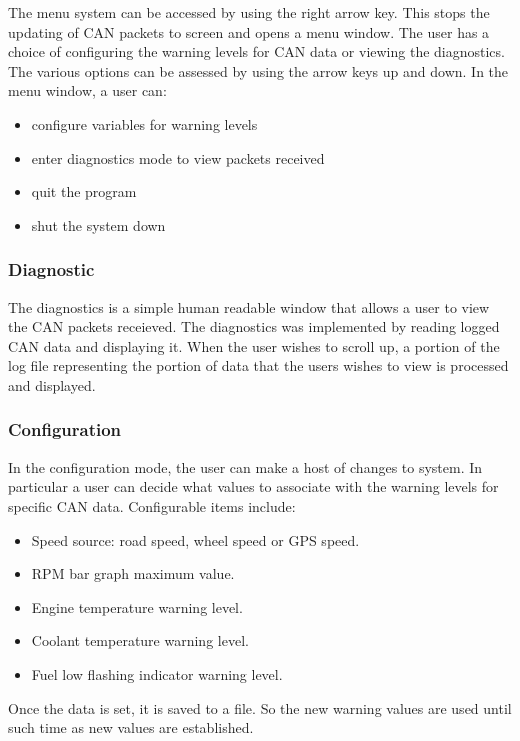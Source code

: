 \documentclass[11pt]{report} %
\begin{document}
		The menu system can be accessed by using the right arrow key. This stops the updating of CAN packets to screen and
		opens a menu window. The user has a choice of configuring the warning levels for CAN data or viewing the diagnostics.
		The various options can be assessed by using the arrow keys up and down. In the menu window, a user can:
		
			
	\begin{itemize}
	\item configure variables for warning levels
	\item enter diagnostics mode to view packets received
	\item quit the program
	\item shut the system down
	\end{itemize}
	
		
	\subsubsection{Diagnostic}
		
		The diagnostics is a simple human readable window that allows a user to view the CAN packets receieved. The diagnostics 
		was implemented by reading logged CAN data and displaying it. When the user wishes to scroll up, a portion of the log file 
		representing the portion of data that the users wishes to view is processed and displayed.
		
	\subsubsection {Configuration}
	\label{diag_menu}
		
		In the configuration mode, the user can make a host of changes to system. In particular a user can decide what values
		to associate with the warning levels for specific CAN data. Configurable items include:
			
	\begin{itemize}
	\item Speed source: road speed, wheel speed or GPS speed.
	\item RPM bar graph maximum value.
	\item Engine temperature warning level.
	\item Coolant temperature warning level.
	\item Fuel low flashing indicator warning level.
	\end{itemize}
		
	Once the data is set, it is saved to a file. So the new warning values are used until 
	such time as new values are established.
\end{document}
